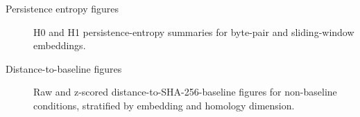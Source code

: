 

\begin{description}
  \item[Persistence entropy figures]
  H0 and H1 persistence-entropy summaries for byte-pair and sliding-window embeddings.
  \item[Distance-to-baseline figures]
  Raw and z-scored distance-to-SHA-256-baseline figures for non-baseline conditions, stratified by embedding and homology dimension.
\end{description}
